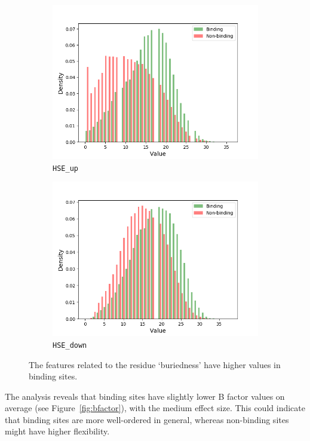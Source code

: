 \begin{figure}[!htbp]
\begin{subfigure}{.5\textwidth}
  \includegraphics[width=1\linewidth]{../img/HSE_up_hist.png}
  \caption{\texttt{HSE\_up}}
\end{subfigure}%
\begin{subfigure}{.5\textwidth}
  \centering
  \includegraphics[width=1\linewidth]{../img/HSE_down_hist.png}
  \caption{\texttt{HSE\_down}}
\end{subfigure}
\caption{The features related to the residue `buriedness' have higher values in binding sites.}
\label{fig:buriedness}
\end{figure}

The analysis reveals that binding sites have slightly lower B factor values on average (see Figure~\ref{fig:bfactor}), with the medium effect size. This could indicate that binding sites are more well-ordered in general, whereas non-binding sites might have higher flexibility.

